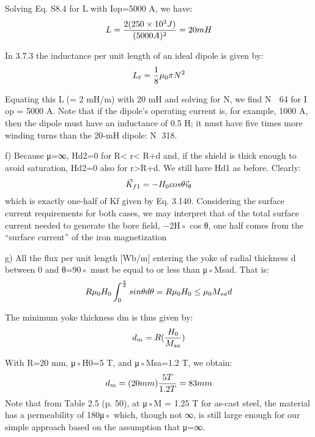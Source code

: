 Solving Eq. S8.4 for L with Iop=5000 A, we have:
$$
L=\frac{2(250\times10^{3}J)}{(5000A)^{2}}\\=20mH\\
$$

In 3.7.3 the inductance per unit length of an ideal dipole is given by:
$$
L_{\ell}=\frac{1}{8}\mu_{0}\pi N^{2}\\%
$$

Equating this L(= 2 mH/m) with 20 mH and solving for N, we find N  64 for
I
op = 5000 A. Note that if the dipole’s operating current is, for example, 1000 A,
then the dipole must have an inductance of 0.5 H; it must have five times more
winding turns than the 20-mH dipole: N 318.

f) Because μ=∞, Hd2=0 for R< r< R+d and, if the shield is thick enough to
avoid saturation, Hd2=0 also for r>R+d. We still have Hd1 as before. Clearly:
$$
\vec{K}_{f1}=-H_{0}cos\theta\vec{\imath}_{\theta}\\%
$$
which is exactly one-half of Kf given by Eq. 3.140. Considering the surface current
requirements for both cases, we may interpret that of the total surface current
needed to generate the bore field, −2H◦ cos θ, one half comes from the “surface
current” of the iron magnetization

g) All the flux per unit length [Wb/m] entering the yoke of radial thickness d
between 0 and θ=90◦ must be equal to or less than μ◦Msad. That is:
$$
R\mu_{0}H_{0}\int_{0}^{\frac{\pi}{2}}sin\theta d\theta=R\mu_{0}H_{0}\leq\mu_{0}M_{sa}d\\%
$$

The minimum yoke thickness dm is thus given by:
$$
d_{m}=R(\frac{H_{0}}{M_{sa}})\\%
$$

With R=20 mm, μ◦H0=5 T, and μ◦Msa=1.2 T, we obtain:
$$d_{m}=(20mm)\frac{5T}{1.2T}=83mm\\$$
Note that from Table 2.5 (p. 50), at μ◦M = 1.25 T for as-cast steel, the material
has a permeability of 180μ◦ which, though not ∞, is still large enough for our
simple approach based on the assumption that μ=∞.
\newpage

